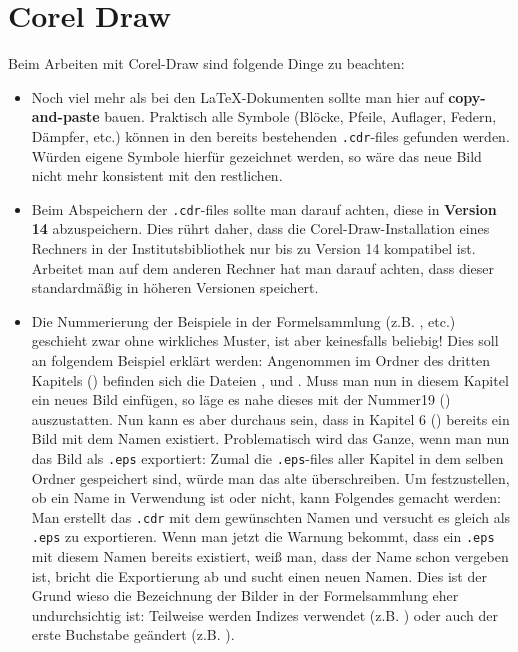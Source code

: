 \chapter{Corel Draw}

Beim Arbeiten mit Corel-Draw sind folgende Dinge zu beachten:

\begin{itemize}
  \item Noch viel mehr als bei den \LaTeX-Dokumenten sollte man hier auf
    {\bf copy-and-paste} bauen. Praktisch alle Symbole (Blöcke, Pfeile,
    Auflager, Federn, Dämpfer, etc.) können in den bereits bestehenden 
    {\tt .cdr}-files gefunden werden. Würden eigene Symbole hierfür gezeichnet
    werden, so wäre das neue Bild nicht mehr konsistent mit den restlichen.
  \item Beim Abspeichern der {\tt .cdr}-files sollte man darauf achten, diese
    in {\bf Version 14} abzuspeichern. Dies rührt daher, dass die 
    Corel-Draw-Installation eines Rechners in der Institutsbibliothek nur bis zu
    Version 14 kompatibel ist. Arbeitet man auf dem anderen Rechner hat man 
    darauf achten, dass dieser standardmäßig in höheren Versionen speichert.
  \item Die Nummerierung der Beispiele in der Formelsammlung (z.B.
    , etc.) geschieht zwar ohne wirkliches Muster, ist aber 
    keinesfalls beliebig! Dies soll an folgendem Beispiel erklärt werden: 
    Angenommen im Ordner des dritten Kapitels
    () befinden sich die Dateien 
    ,  und . Muss man nun in 
    diesem Kapitel ein neues Bild einfügen, so läge es nahe dieses mit der 
    Nummer19 () auszustatten. Nun kann es aber durchaus sein, 
    dass in  Kapitel 6 () bereits ein Bild mit dem Namen
     existiert. Problematisch wird das Ganze, wenn
    man nun das Bild als {\tt .eps} exportiert: Zumal die {\tt .eps}-files
    aller Kapitel in dem selben Ordner gespeichert sind, würde man das alte 
    überschreiben.\newline
    Um festzustellen, ob ein Name in Verwendung ist oder nicht, kann 
    Folgendes gemacht werden: Man erstellt das {\tt .cdr} mit dem gewünschten 
    Namen und versucht es gleich als {\tt .eps} zu exportieren. Wenn man jetzt 
    die  Warnung bekommt, dass ein {\tt .eps} mit diesem Namen bereits
    existiert, weiß man, dass der Name schon vergeben ist, bricht die 
    Exportierung ab und sucht einen neuen Namen. Dies ist der Grund wieso die 
    Bezeichnung der Bilder in der Formelsammlung eher undurchsichtig ist: 
    Teilweise werden Indizes verwendet (z.B. ) oder auch der
    erste Buchstabe geändert (z.B. ).
\end{itemize}


